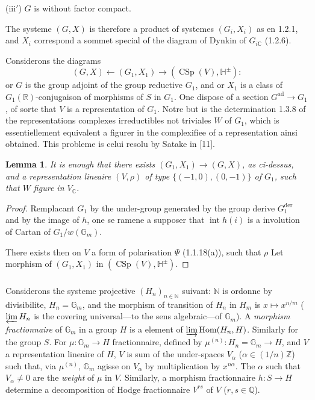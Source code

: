 \documentclass[12pt,a4paper]{article}
\theoremstyle{plain}
\newtheorem{lemma}[theorem]{Lemma}
\theoremstyle{definition}
\theoremstyle{remark}
\DeclareMathOperator{\Hom}{Hom}
\DeclareMathOperator{\CSp}{CSp}
\DeclareMathOperator{\Int}{int}
\newcommand{\ZZ}{\mathbb{Z}}
\newcommand{\QQ}{\mathbb{Q}}
\newcommand{\RR}{\mathbb{R}}
\newcommand{\CC}{\mathbb{C}}
\newcommand{\HH}{\mathbb{H}}
\newcommand{\NN}{\mathbb{N}}
\newcommand{\Gm}{\mathbb{G}}
\begin{document}
(iii$'$) $G$ is without factor compact.

The systeme $(G,X)$ is therefore a product of systemes $(G_i,X_i)$ as en 1.2.1, and $X_i$ correspond a sommet special of the diagram of Dynkin of $G_{i\CC}$ (1.2.6).

Considerons the diagrams
\[
(G,X) \longleftarrow (G_1,X_1) \longrightarrow (\CSp(V),\HH^{\pm}):
\]
or $G$ is the group adjoint of the group reductive $G_1$, and or $X_1$ is a class of $G_1(\RR)$-conjugaison of morphisms of $S$ in $G_1$. One dispose of a section $G^{\text{ad}} \to G_1$, of sorte that $V$ is a representation of $G_1$. Notre but is the determination 1.3.8 of the representations complexes irreductibles not triviales $W$ of $G_1$, which is essentiellement equivalent a figurer in the complexifiee of a representation ainsi obtained. This probleme is celui resolu by Satake in [11].

\begin{lemma}
It is enough that there exists $(G_1,X_1) \to (G,X)$, as ci-dessus, and a representation lineaire $(V,\rho)$ of type $\{(-1,0),(0,-1)\}$ of $G_1$, such that $W$ figure in $V_{\CC}$.
\end{lemma}

\begin{proof}
Remplacant $G_1$ by the under-group generated by the group derive $G_1^{\text{der}}$ and by the image of $h$, one se ramene a supposer that $\Int h(i)$ is a involution of Cartan of $G_1/w(\Gm_m)$.

There exists then on $V$ a form of polarisation $\Psi$ (1.1.18(a)), such that $\rho$ Let morphism of $(G_1,X_1)$ in $(\CSp(V),\HH^{\pm})$.
\end{proof}

\subsubsection{}

Considerons the systeme projective $(H_n)_{n \in \NN}$ suivant: $\NN$ is ordonne by divisibilite, $H_n = \Gm_m$, and the morphism of transition of $H_n$ in $H_m$ is $x \mapsto x^{n/m}$ ($\varprojlim H_n$ is the covering universal---to the sens algebraic---of $\Gm_m$). A \textit{morphism fractionnaire} of $\Gm_m$ in a group $H$ is a element of $\varinjlim \Hom(H_n,H)$. Similarly for the group $S$. For $\mu:\Gm_m \to H$ fractionnaire, defined by $\mu^{(n)}:H_n = \Gm_m \to H$, and $V$ a representation lineaire of $H$, $V$ is sum of the under-spaces $V_\alpha$ ($\alpha \in (1/n)\ZZ$) such that, via $\mu^{(n)}$, $\Gm_m$ agisse on $V_\alpha$ by multiplication by $x^{n\alpha}$. The $\alpha$ such that $V_\alpha \neq 0$ are the \textit{weight} of $\mu$ in $V$. Similarly, a morphism fractionnaire $h:S \to H$ determine a decomposition of Hodge fractionnaire $V^{rs}$ of $V$ ($r,s \in \QQ$).
\end{document}
